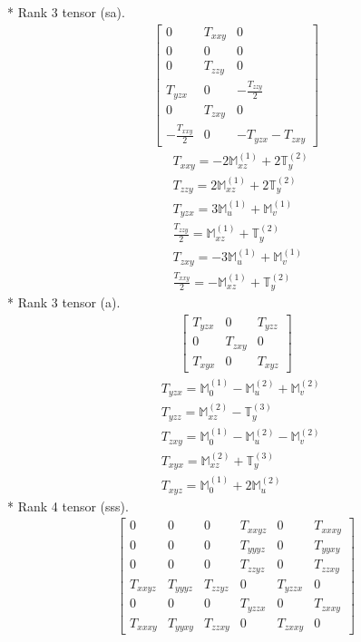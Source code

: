 \documentclass[fleqn,8pt,landscape]{jsarticle}
\begin{document}
* Rank 3 tensor (sa).
\begin{align*}
\begin{bmatrix} 0 & T_{xxy} & 0 \\ 0 & 0 & 0 \\ 0 & T_{zzy} & 0 \\ T_{yzx} & 0 & - \frac{T_{zzy}}{2} \\ 0 & T_{zxy} & 0 \\ - \frac{T_{xxy}}{2} & 0 & - T_{yzx} - T_{zxy} \end{bmatrix}
\end{align*}
\begin{align*}
& T_{xxy} = - 2 \mathbb{M}_{xz}^{(1)} + 2 \mathbb{T}_{y}^{(2)} \\
& T_{zzy} = 2 \mathbb{M}_{xz}^{(1)} + 2 \mathbb{T}_{y}^{(2)} \\
& T_{yzx} = 3 \mathbb{M}_{u}^{(1)} + \mathbb{M}_{v}^{(1)} \\
& \frac{T_{zzy}}{2} = \mathbb{M}_{xz}^{(1)} + \mathbb{T}_{y}^{(2)} \\
& T_{zxy} = - 3 \mathbb{M}_{u}^{(1)} + \mathbb{M}_{v}^{(1)} \\
& \frac{T_{xxy}}{2} = - \mathbb{M}_{xz}^{(1)} + \mathbb{T}_{y}^{(2)}
\end{align*}
* Rank 3 tensor (a).
\begin{align*}
\begin{bmatrix} T_{yzx} & 0 & T_{yzz} \\ 0 & T_{zxy} & 0 \\ T_{xyx} & 0 & T_{xyz} \end{bmatrix}
\end{align*}
\begin{align*}
& T_{yzx} = \mathbb{M}_{0}^{(1)} - \mathbb{M}_{u}^{(2)} + \mathbb{M}_{v}^{(2)} \\
& T_{yzz} = \mathbb{M}_{xz}^{(2)} - \mathbb{T}_{y}^{(3)} \\
& T_{zxy} = \mathbb{M}_{0}^{(1)} - \mathbb{M}_{u}^{(2)} - \mathbb{M}_{v}^{(2)} \\
& T_{xyx} = \mathbb{M}_{xz}^{(2)} + \mathbb{T}_{y}^{(3)} \\
& T_{xyz} = \mathbb{M}_{0}^{(1)} + 2 \mathbb{M}_{u}^{(2)}
\end{align*}
* Rank 4 tensor (sss).
\begin{align*}
\begin{bmatrix} 0 & 0 & 0 & T_{xxyz} & 0 & T_{xxxy} \\ 0 & 0 & 0 & T_{yyyz} & 0 & T_{yyxy} \\ 0 & 0 & 0 & T_{zzyz} & 0 & T_{zzxy} \\ T_{xxyz} & T_{yyyz} & T_{zzyz} & 0 & T_{yzzx} & 0 \\ 0 & 0 & 0 & T_{yzzx} & 0 & T_{zxxy} \\ T_{xxxy} & T_{yyxy} & T_{zzxy} & 0 & T_{zxxy} & 0 \end{bmatrix}
\end{align*}
\end{document}
